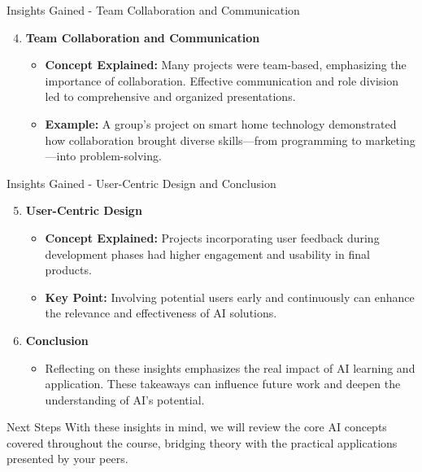 \documentclass[aspectratio=169]{beamer}
\begin{document}
\begin{frame}[fragile]{Insights Gained - Team Collaboration and Communication}
    \begin{enumerate}
        \setcounter{enumi}{3} %
        \item \textbf{Team Collaboration and Communication}
        \begin{itemize}
            \item \textbf{Concept Explained:} Many projects were team-based, emphasizing the importance of collaboration. Effective communication and role division led to comprehensive and organized presentations.
            \item \textbf{Example:} A group's project on smart home technology demonstrated how collaboration brought diverse skills—from programming to marketing—into problem-solving.
        \end{itemize}
    \end{enumerate}
\end{frame}

\begin{frame}[fragile]{Insights Gained - User-Centric Design and Conclusion}
    \begin{enumerate}
        \setcounter{enumi}{4} %
        \item \textbf{User-Centric Design}
        \begin{itemize}
            \item \textbf{Concept Explained:} Projects incorporating user feedback during development phases had higher engagement and usability in final products.
            \item \textbf{Key Point:} Involving potential users early and continuously can enhance the relevance and effectiveness of AI solutions.
        \end{itemize}
        
        \item \textbf{Conclusion}
        \begin{itemize}
            \item Reflecting on these insights emphasizes the real impact of AI learning and application. These takeaways can influence future work and deepen the understanding of AI's potential.
        \end{itemize}
    \end{enumerate}
\end{frame}

\begin{frame}[fragile]{Next Steps}
    With these insights in mind, we will review the core AI concepts covered throughout the course, bridging theory with the practical applications presented by your peers.
\end{frame}
\end{document}

